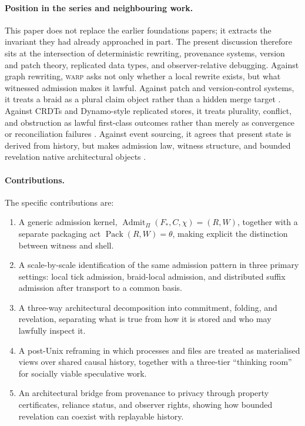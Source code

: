\documentclass[11pt]{article}
\theoremstyle{definition}
\theoremstyle{plain}
\theoremstyle{remark}
\newcommand{\WARP}{\textsc{warp}}
\begin{document}
\paragraph{Position in the series and neighbouring work.}
This paper does not replace the earlier foundations papers; it extracts the invariant they had already approached in part. The present discussion therefore sits at the intersection of deterministic rewriting, provenance systems, version and patch theory, replicated data types, and observer-relative debugging. Against graph rewriting, \WARP{} asks not only whether a local rewrite exists, but what witnessed admission makes it lawful. Against patch and version-control systems, it treats a braid as a plural claim object rather than a hidden merge target \cite{jacobson2009darcs,mimram2013patch}. Against CRDTs and Dynamo-style replicated stores, it treats plurality, conflict, and obstruction as lawful first-class outcomes rather than merely as convergence or reconciliation failures \cite{decandia2007dynamo,shapiro2011crdt}. Against event sourcing, it agrees that present state is derived from history, but makes admission law, witness structure, and bounded revelation native architectural objects \cite{fowler2005eventsourcing}.

\paragraph{Contributions.}
The specific contributions are:

\begin{enumerate}[leftmargin=*]
  \item A generic admission kernel, \(\operatorname{Admit}_{\Pi}(F_*, C, \chi) = (R, W)\), together with a separate packaging act \(\operatorname{Pack}(R, W) = \theta\), making explicit the distinction between witness and shell.

  \item A scale-by-scale identification of the same admission pattern in three primary settings: local tick admission, braid-local admission, and distributed suffix admission after transport to a common basis.

  \item A three-way architectural decomposition into commitment, folding, and revelation, separating what is true from how it is stored and who may lawfully inspect it.

  \item A post-Unix reframing in which processes and files are treated as materialised views over shared causal history, together with a three-tier ``thinking room'' for socially viable speculative work.

  \item An architectural bridge from provenance to privacy through property certificates, reliance status, and observer rights, showing how bounded revelation can coexist with replayable history.
\end{enumerate}
\end{document}
